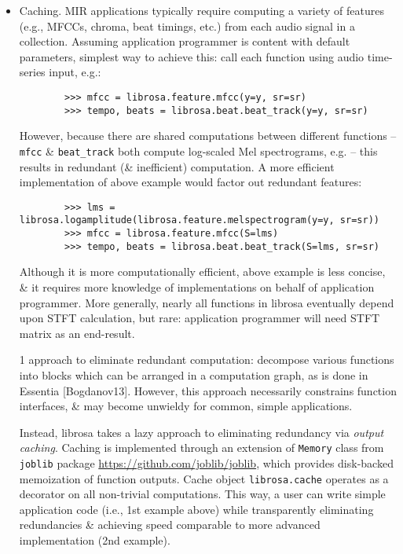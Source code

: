 \documentclass{article}
\begin{document}
\begin{itemize}
\begin{itemize}
		{\tt output} module also provides \verb|wirte_wav| function for saving audio in {\tt.wave} format. \verb|write_wav| simply wraps built-in {\tt scipy} wave-file writer {\tt scipy.io.wavfile.write} with validation \& optional normalization, thus ensuring: resulting audio files are well-formed.
	\end{itemize}
	\item {\sf Caching.} MIR applications typically require computing a variety of features (e.g., MFCCs, chroma, beat timings, etc.) from each audio signal in a collection. Assuming application programmer is content with default parameters, simplest way to achieve this: call each function using audio time-series input, e.g.:
	\begin{verbatim}
		>>> mfcc = librosa.feature.mfcc(y=y, sr=sr)
		>>> tempo, beats = librosa.beat.beat_track(y=y, sr=sr)
	\end{verbatim}
	However, because there are shared computations between different functions -- {\tt mfcc} \& \verb|beat_track| both compute log-scaled Mel spectrograms, e.g. -- this results in redundant (\& inefficient) computation. A more efficient implementation of above example would factor out redundant features:
	\begin{verbatim}
		>>> lms = librosa.logamplitude(librosa.feature.melspectrogram(y=y, sr=sr))
		>>> mfcc = librosa.feature.mfcc(S=lms)
		>>> tempo, beats = librosa.beat.beat_track(S=lms, sr=sr)
	\end{verbatim}
	Although it is more computationally efficient, above example is less concise, \& it requires more knowledge of implementations on behalf of application programmer. More generally, nearly all functions in librosa eventually depend upon STFT calculation, but rare: application programmer will need STFT matrix as an end-result.
	
	1 approach to eliminate redundant computation: decompose various functions into blocks which can be arranged in a computation graph, as is done in Essentia [Bogdanov13]. However, this approach necessarily constrains function interfaces, \& may become unwieldy for common, simple applications.
	
	Instead, librosa takes a lazy approach to eliminating redundancy via {\it output caching}. Caching is implemented through an extension of {\tt Memory} class from {\tt joblib} package \url{https://github.com/joblib/joblib}, which provides disk-backed memoization of function outputs. Cache object {\tt librosa.cache} operates as a decorator on all non-trivial computations. This way, a user can write simple application code (i.e., 1st example above) while transparently eliminating redundancies \& achieving speed comparable to more advanced implementation (2nd example).
	

\end{itemize}
\end{document}
